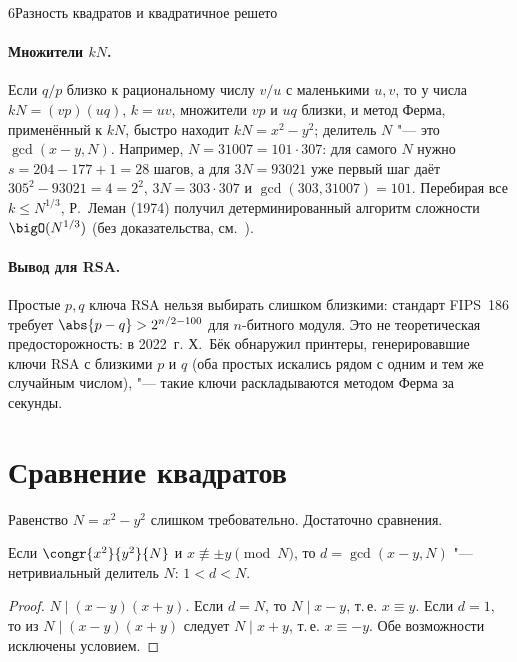 \begin{lecture}{6}{Разность квадратов и квадратичное решето}
\paragraph{Множители $kN$.} Если $q/p$ близко к рациональному числу $v/u$ с маленькими $u, v$,
то у числа $kN = (vp)(uq)$, $k = uv$, множители $vp$ и $uq$ близки, и метод Ферма, применённый к
$kN$, быстро находит $kN = x^2 - y^2$; делитель $N$ "--- это $\gcd(x - y, N)$. Например,
$N = 31007 = 101 \cdot 307$: для самого $N$ нужно $s = 204 - 177 + 1 = 28$ шагов, а для
$3N = 93021$ уже первый шаг даёт $305^2 - 93021 = 4 = 2^2$, $3N = 303 \cdot 307$ и
$\gcd(303, 31007) = 101$. Перебирая все $k \le N^{1/3}$, Р.~Леман (1974) получил
детерминированный алгоритм сложности $\bigO(N^{1/3})$ (без доказательства,
см.~\cite[разд.~5.1]{crandall-pomerance}).

\paragraph{Вывод для RSA.} Простые $p, q$ ключа RSA нельзя выбирать слишком близкими:
стандарт FIPS~186 требует $\abs{p - q} > 2^{n/2 - 100}$ для $n$-битного модуля. Это не
теоретическая предосторожность: в 2022~г. Х.~Бёк обнаружил принтеры, генерировавшие ключи RSA с
близкими $p$ и $q$ (оба простых искались рядом с одним и тем же случайным числом), "--- такие ключи раскладываются
методом Ферма за секунды.



\section{Сравнение квадратов}

Равенство $N = x^2 - y^2$ слишком требовательно. Достаточно сравнения.

\begin{lemma}\label{l6:cong}
Если $\congr{x^2}{y^2}{N}$ и $x \not\equiv \pm y \pmod N$, то $d = \gcd(x - y, N)$ "---
нетривиальный делитель $N$: $1 < d < N$.
\end{lemma}

\begin{proof}
$N \mid (x - y)(x + y)$. Если $d = N$, то $N \mid x - y$, т.\,е. $x \equiv y$. Если $d = 1$, то
из $N \mid (x - y)(x + y)$ следует $N \mid x + y$, т.\,е. $x \equiv -y$. Обе возможности
исключены условием.
\end{proof}


\end{lecture}
